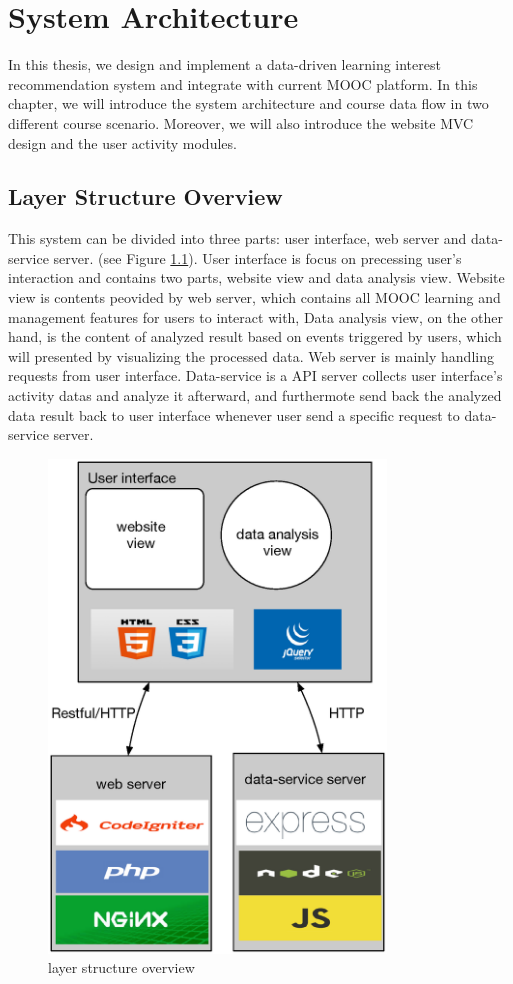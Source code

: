 \chapter{System Architecture}
In this thesis, we design and implement a data-driven learning interest recommendation system and integrate with current MOOC platform.
In this chapter, we  will introduce the system architecture and course data flow in two different course scenario.
Moreover, we will also introduce the website MVC design and the user activity modules.

\section{Layer Structure Overview}
This system can be divided into three parts: user interface, web server and data-service server. (see Figure \ref{fig:layer-overview}).
User interface is focus on precessing user's interaction and contains two parts, website view and data analysis view.
Website view is contents peovided by web server, which contains all MOOC learning and management features for users to interact with,
Data analysis view, on the other hand, is the content of analyzed result based on events triggered by users, which will presented by visualizing the processed data.
Web server is mainly handling requests from user interface.
Data-service is a API server collects user interface's activity datas and analyze it afterward, and furthermote send back the analyzed data result back to user interface whenever user send a specific request to data-service server.

\begin{figure}[H]
    \centering
    \includegraphics[width = 0.8\textwidth]{fig/layer-structure-overview.eps}
    \caption{layer structure overview}
    \label{fig:layer-overview}
\end{figure}

